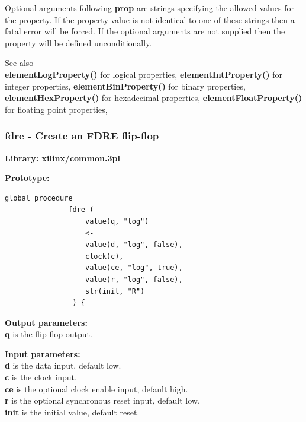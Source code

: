             Optional arguments following {\bf prop} are strings specifying the allowed
            values for the property. If the property value is not identical to one
            of these strings then a fatal error will be forced. If the optional
            arguments are not supplied then the property will be defined
            unconditionally.
            
            See also - \\
            {\bf elementLogProperty()}  for logical properties,
            {\bf elementIntProperty()}  for integer properties,
            {\bf elementBinProperty()}  for binary properties,
            {\bf elementHexProperty()}  for hexadecimal properties,
            {\bf elementFloatProperty()}  for floating point properties,

  



        \subsubsection{fdre - Create an FDRE flip-flop}\label{sec:lpfdre}
            
            {\bf Library: xilinx/common.3pl}

            {\bf Prototype:} \\
            \vsp
            \begin{lstlisting}[gobble=12, language=threepl]
               global procedure
               fdre (
                   value(q, "log")
                   <-
                   value(d, "log", false),
                   clock(c),
                   value(ce, "log", true),
                   value(r, "log", false),
                   str(init, "R")
                ) {
            \end{lstlisting}

            {\bf Output parameters:} \\
            {\bf q} is the flip-flop output.

            {\bf Input parameters:} \\            
            {\bf d} is the data input, default low.\\
            {\bf c} is the clock input.\\
            {\bf ce} is the optional clock enable input, default high.\\
            {\bf r} is the optional synchronous reset input, default low. \\
            {\bf init} is the initial value, default reset.
        
